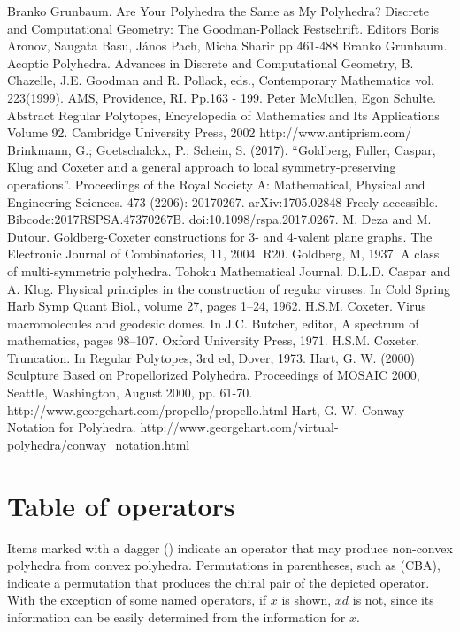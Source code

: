 \documentclass{amsart}[12pt]
\begin{document}
\begin{thebibliography}{1}
 Branko Grunbaum. Are Your Polyhedra the Same as My
  Polyhedra? Discrete and Computational Geometry: The Goodman-Pollack
  Festschrift. Editors Boris Aronov, Saugata Basu, János Pach, Micha Sharir
  pp 461-488
 Branko Grunbaum. Acoptic Polyhedra. Advances in Discrete
  and Computational Geometry, B. Chazelle, J.E. Goodman and R. Pollack, eds.,
  Contemporary Mathematics vol. 223(1999). AMS, Providence, RI. Pp.163 - 199.
 Peter McMullen, Egon Schulte. Abstract Regular Polytopes,
  Encyclopedia of Mathematics and Its Applications Volume 92.
  Cambridge University Press, 2002
 http://www.antiprism.com/
 Brinkmann, G.; Goetschalckx, P.; Schein, S. (2017).
  ``Goldberg, Fuller, Caspar, Klug and Coxeter and a general approach to local
  symmetry-preserving operations''. Proceedings of the Royal Society A:
  Mathematical, Physical and Engineering Sciences. 473 (2206): 20170267.
  arXiv:1705.02848 Freely accessible. Bibcode:2017RSPSA.47370267B.
  doi:10.1098/rspa.2017.0267.
 M. Deza and M. Dutour. Goldberg-Coxeter constructions for 3-
   and 4-valent plane graphs. The Electronic Journal of Combinatorics,
   11, 2004. R20.
 Goldberg, M, 1937. A class of multi-symmetric polyhedra.
    Tohoku Mathematical Journal.
 D.L.D. Caspar and A. Klug. Physical principles in the
  construction of regular viruses. In Cold Spring Harb Symp Quant Biol.,
  volume 27, pages 1–24, 1962.
 H.S.M. Coxeter. Virus macromolecules and geodesic domes.
  In J.C. Butcher, editor, A spectrum of mathematics, pages 98–107.
  Oxford University Press, 1971.
 H.S.M. Coxeter. Truncation. In Regular Polytopes, 3rd ed, Dover, 1973.
 Hart, G. W. (2000) Sculpture Based on Propellorized
  Polyhedra. Proceedings of MOSAIC 2000, Seattle, Washington, August 2000,
  pp. 61-70.  http://www.georgehart.com/propello/propello.html
 Hart, G. W. Conway Notation for Polyhedra.
  http://www.georgehart.com/virtual-polyhedra/conway\_notation.html
\end{thebibliography}

\appendix
\section{Table of operators}
Items marked with a dagger (\dag) indicate an operator that may produce non-convex polyhedra from convex polyhedra. Permutations in parentheses, such as (CBA), indicate a permutation that produces the chiral pair of the depicted operator. With the exception of some named operators, if $x$ is shown, $xd$ is not, since its information can be easily determined from the information for
$x$.
\end{document}
